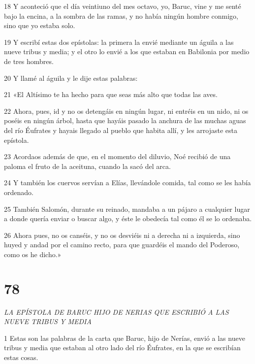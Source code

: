 \par 18 Y aconteció que el día veintiuno del mes octavo, yo, Baruc, vine y me senté bajo la encina, a la sombra de las ramas, y no había ningún hombre conmigo, sino que yo estaba solo.

\par 19 Y escribí estas dos epístolas: la primera la envié mediante un águila a las nueve tribus y media; y el otro lo envié a los que estaban en Babilonia por medio de tres hombres.

\par 20 Y llamé al águila y le dije estas palabras:

\par 21 «El Altísimo te ha hecho para que seas más alto que todas las aves.

\par 22 Ahora, pues, id y no os detengáis en ningún lugar, ni entréis en un nido, ni os poséis en ningún árbol, hasta que hayáis pasado la anchura de las muchas aguas del río Éufrates y hayais llegado al pueblo que habita allí, y les arrojaste esta epístola.

\par 23 Acordaos además de que, en el momento del diluvio, Noé recibió de una paloma el fruto de la aceituna, cuando la sacó del arca.

\par 24 Y también los cuervos servían a Elías, llevándole comida, tal como se les había ordenado.

\par 25 También Salomón, durante su reinado, mandaba a un pájaro a cualquier lugar a donde quería enviar o buscar algo, y éste le obedecía tal como él se lo ordenaba.

\par 26 Ahora pues, no os canséis, y no os desviéis ni a derecha ni a izquierda, sino huyed y andad por el camino recto, para que guardéis el mando del Poderoso, como os he dicho.»

\chapter{78}

\par \textit{LA EPÍSTOLA DE BARUC HIJO DE NERIAS QUE ESCRIBIÓ A LAS NUEVE TRIBUS Y MEDIA}

\par 1 Estas son las palabras de la carta que Baruc, hijo de Nerías, envió a las nueve tribus y media que estaban al otro lado del río Éufrates, en la que se escribían estas cosas.


